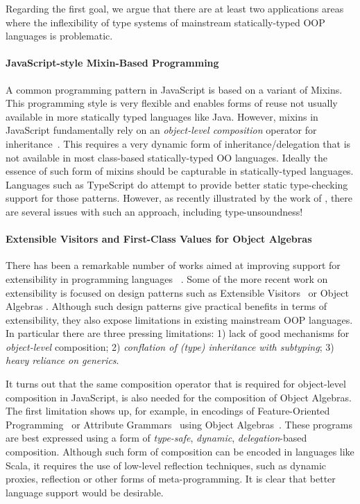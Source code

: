 Regarding the first goal, we argue that there are at least two
applications areas where the inflexibility of type systems of
mainstream statically-typed OOP languages is problematic.

\paragraph{\bf JavaScript-style Mixin-Based Programming}
A common programming pattern in JavaScript is based on a variant of
Mixins. This programming style is very flexible and enables forms 
of reuse not usually available in more statically typed languages like Java.
However, mixins in JavaScript fundamentally rely on an \emph{object-level composition}
operator for inheritance~\cite{}. This requires a very dynamic form of
inheritance/delegation that is not available in most class-based 
statically-typed OO languages. Ideally the essence of such 
form of mixins should be capturable in statically-typed languages. 
Languages such as TypeScript do attempt to provide better static
type-checking support for those patterns. However, as recently illustrated 
by the work of \citet{alpuimdisjoint}, there are several issues with such an
approach, including type-unsoundness! 

\paragraph{\bf Extensible Visitors and First-Class Values for Object Algebras}
There has been a remarkable number of works aimed at improving support
for extensibility in programming languages
~\cite{Prehofer97,Tarr99ndegrees,Harrison93subject,McDirmid01Jiazzi,Aracic06CaesarJ,Smaragdakis98mixin,nystrom2006j,togersen:2004,Zenger-Odersky2005,oliveira09modular,oliveira2012extensibility}. 
Some of the more recent work on extensibility is focused on design
patterns such as Extensible
Visitors~\cite{togersen:2004,oliveira09modular} or Object Algebras
\cite{oliveira2012extensibility}. 
Although such design patterns give practical benefits in terms of
extensibility, they also expose limitations in existing mainstream OOP
languages. In particular there are three pressing limitations: 
1) lack of good mechanisms for
  \emph{object-level} composition; 2) \emph{conflation of 
    (type) inheritance with subtyping}; 3) \emph{heavy reliance on generics}.

It turns out that the same composition operator that is required for 
object-level composition in JavaScript, is also needed for the
composition of Object Algebras.
The first limitation shows up, for example, in encodings of Feature-Oriented
Programming~\cite{Prehofer97} or Attribute Grammars~\cite{Knuth1968} using Object
Algebras~\cite{oliveira2013feature,rendel14attributes}. These programs are best
expressed using a form of \emph{type-safe}, \emph{dynamic},
\emph{delegation}-based composition. Although such form of
composition can be encoded in languages like Scala, it requires the
use of low-level reflection techniques, such as dynamic proxies,
reflection or other forms of meta-programming. It is clear
that better language support would be desirable.


